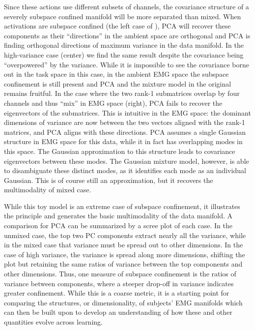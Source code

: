\documentclass[../main.tex]{subfiles}
\begin{document}
Since these actions use different subsets of channels, the covariance structure of a severely subspace confined manifold will be more separated than mixed. When activations are subspace confined (the left case of ), PCA will recover these components as their ``directions'' in the ambient space are orthogonal and PCA is finding orthogonal directions of maximum variance in the data manifold. In the high-variance case (center) we find the same result despite the covariance being ``overpowered'' by the variance. While it is impossible to see the covariance borne out in the task space in this case, in the ambient EMG space the subspace confinement is still present and PCA and the mixture model in the original remains fruitful. In the case where the two rank-1 submatrices overlap by four channels and thus ``mix'' in EMG space (right), PCA fails to recover the eigenvectors of the submatrices. This is intuitive in the EMG space: the dominant dimensions of variance are now between the two vectors aligned with the rank-1 matrices, and PCA aligns with these directions. PCA assumes a single Gaussian structure in EMG space for this data, while it in fact has overlapping modes in this space. The Gaussian approximation to this structure leads to covariance eigenvectors between these modes. The Gaussian mixture model, however, is able to disambiguate these distinct modes, as it identifies each mode as an individual Gaussian. This is of course still an approximation, but it recovers the multimodality of mixed case.

While this toy model is an extreme case of subspace confinement, it illustrates the principle and generates the basic multimodality of the data manifold. A comparison for PCA can be summarized by a scree plot of each case. In the unmixed case, the top two PC components extract nearly all the variance, while in the mixed case that variance must be spread out to other dimensions. In the case of high variance, the variance is spread along more dimensions, shifting the plot but retaining the same ratios of variance between the top components and other dimensions. Thus, one measure of subspace confinement is the ratios of variance between components, where a steeper drop-off in variance indicates greater confinement. While this is a coarse metric, it is a starting point for comparing the structures, or dimensionality, of subjects' EMG manifolds which can then be built upon to develop an understanding of how these and other quantities evolve across learning.

\end{document}
